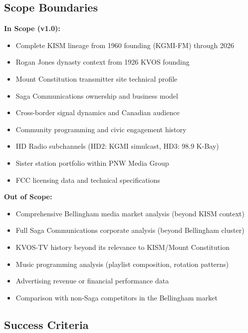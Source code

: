 \documentclass[11pt,letterpaper]{article}
\begin{document}
\subsection{Scope Boundaries}

\textbf{In Scope (v1.0):}
\begin{itemize}[nosep]
\item Complete KISM lineage from 1960 founding (KGMI-FM) through 2026
\item Rogan Jones dynasty context from 1926 KVOS founding
\item Mount Constitution transmitter site technical profile
\item Saga Communications ownership and business model
\item Cross-border signal dynamics and Canadian audience
\item Community programming and civic engagement history
\item HD Radio subchannels (HD2: KGMI simulcast, HD3: 98.9 K-Bay)
\item Sister station portfolio within PNW Media Group
\item FCC licensing data and technical specifications
\end{itemize}

\textbf{Out of Scope:}
\begin{itemize}[nosep]
\item Comprehensive Bellingham media market analysis (beyond KISM context)
\item Full Saga Communications corporate analysis (beyond Bellingham cluster)
\item KVOS-TV history beyond its relevance to KISM/Mount Constitution
\item Music programming analysis (playlist composition, rotation patterns)
\item Advertising revenue or financial performance data
\item Comparison with non-Saga competitors in the Bellingham market
\end{itemize}

\subsection{Success Criteria}
\end{document}
